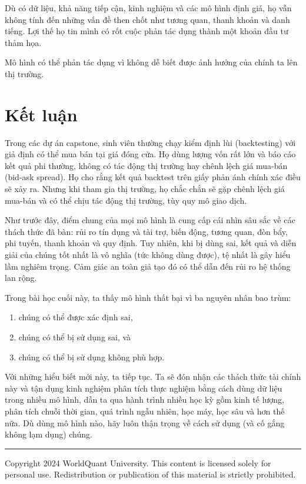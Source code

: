 Dù có dữ liệu, khả năng tiếp cận, kinh nghiệm và các mô hình định giá, họ vẫn không tính đến những vấn đề then chốt như tương quan, thanh khoản và danh tiếng. Lợi thế họ tin mình có rốt cuộc phản tác dụng thành một khoản đầu tư thảm họa.

Mô hình có thể phản tác dụng vì không dễ biết được ảnh hưởng của chính ta lên thị trường.

\section{Kết luận}

Trong các dự án capstone, sinh viên thường chạy kiểm định lùi (backtesting) với giả định có thể mua bán tại giá đóng cửa. Họ dùng lượng vốn rất lớn và báo cáo kết quả phi thường, không có tác động thị trường hay chênh lệch giá mua-bán (bid-ask spread). Họ cho rằng kết quả backtest trên giấy phản ánh chính xác điều sẽ xảy ra. Nhưng khi tham gia thị trường, họ chắc chắn sẽ gặp chênh lệch giá mua-bán và có thể chịu tác động thị trường, tùy quy mô giao dịch.

Như trước đây, điểm chung của mọi mô hình là cung cấp cái nhìn sâu sắc về các thách thức đã bàn: rủi ro tín dụng và tài trợ, biến động, tương quan, đòn bẩy, phi tuyến, thanh khoản và quy định. Tuy nhiên, khi bị dùng sai, kết quả và diễn giải của chúng tốt nhất là vô nghĩa (tức không dùng được), tệ nhất là gây hiểu lầm nghiêm trọng. Cảm giác an toàn giả tạo đó có thể dẫn đến rủi ro hệ thống lan rộng.

Trong bài học cuối này, ta thấy mô hình thất bại vì ba nguyên nhân bao trùm:

\begin{enumerate}
\def\labelenumi{\arabic{enumi}.}
\item
  chúng có thể được xác định sai,
\item
  chúng có thể bị sử dụng sai, và
\item
  chúng có thể bị sử dụng không phù hợp.
\end{enumerate}

Với những hiểu biết mới này, ta tiếp tục. Ta sẽ đón nhận các thách thức tài chính này và tận dụng kinh nghiệm phân tích thực nghiệm bằng cách dùng dữ liệu trong nhiều mô hình, dẫn ta qua hành trình nhiều học kỳ gồm kinh tế lượng, phân tích chuỗi thời gian, quá trình ngẫu nhiên, học máy, học sâu và hơn thế nữa. Dù dùng mô hình nào, hãy luôn thận trọng về cách sử dụng (và cố gắng không lạm dụng) chúng.

\begin{center}\rule{0.5\linewidth}{0.5pt}\end{center}

Copyright 2024 WorldQuant University. This content is licensed solely for personal use. Redistribution or publication of this material is strictly prohibited.
